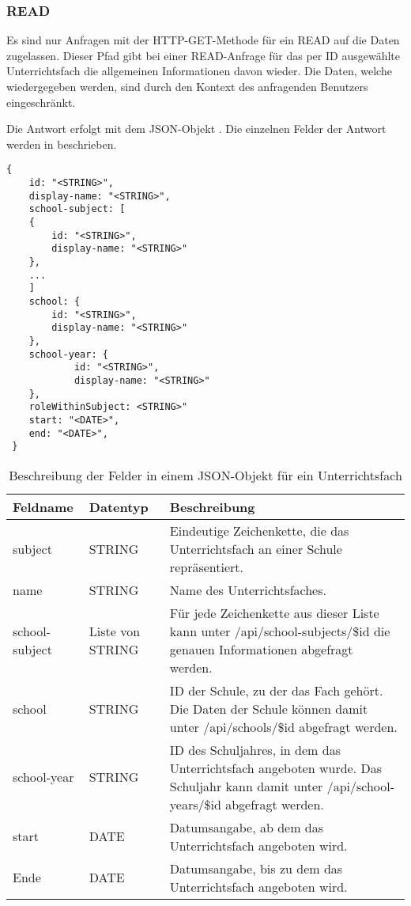 \subsubsection{READ}
\label{sec:rest:api:subjects:id:read}
Es sind nur Anfragen mit der HTTP-GET-Methode für ein READ auf die Daten zugelassen.
Dieser Pfad gibt bei einer READ-Anfrage für das per ID ausgewählte Unterrichtsfach die allgemeinen Informationen davon wieder.
Die Daten, welche wiedergegeben werden, sind durch den Kontext des anfragenden Benutzers eingeschränkt.

Die Antwort erfolgt mit dem JSON-Objekt . 
Die einzelnen Felder der Antwort werden in  beschrieben.


\begin{lstlisting}[caption={JSON-Antwort für einen GET-Aufruf des Pfads /api/subjects/\$id},label={lst:code:rest:api:subjects:id:read:ret},frame=tlrb]
{
    id: "<STRING>",
    display-name: "<STRING>",
    school-subject: [
    {
        id: "<STRING>",
        display-name: "<STRING>"
    },
    ...
    ]
    school: {
        id: "<STRING>",
        display-name: "<STRING>"
    },
    school-year: {
            id: "<STRING>",
            display-name: "<STRING>"
    },
    roleWithinSubject: <STRING>"
    start: "<DATE>",
    end: "<DATE>",
 }
\end{lstlisting}

\begin{longtable}{|p{}|p{}|p{}|}
		\caption{Beschreibung der Felder in einem JSON-Objekt für ein Unterrichtsfach}
\endfoot
		\caption{Beschreibung der Felder in einem JSON-Objekt für ein Unterrichtsfach}
		\label{tab:rest:api:subjects:id:read:ret}
\endlastfoot 
\hline
			\textbf{Feldname} & \textbf{Datentyp} & \textbf{Beschreibung} \\ \hline
\endhead
subject & STRING & Eindeutige Zeichenkette, die das Unterrichtsfach an einer Schule repräsentiert.  \\ \hline
name & STRING & Name des Unterrichtsfaches. \\ \hline
school-subject & Liste von STRING & Für jede Zeichenkette aus dieser Liste kann unter /api/school-subjects/\$id die genauen Informationen abgefragt werden. \\ \hline
school & STRING & ID der Schule, zu der das Fach gehört. Die Daten der Schule können damit unter /api/schools/\$id abgefragt werden. \\ \hline
school-year & STRING & ID des Schuljahres, in dem das Unterrichtsfach angeboten wurde. Das Schuljahr kann damit unter /api/school-years/\$id abgefragt werden. \\ \hline
start & DATE & Datumsangabe, ab dem das Unterrichtsfach angeboten wird.  \\ \hline
Ende & DATE & Datumsangabe, bis zu dem das Unterrichtsfach angeboten wird. \\ \hline
\end{longtable}
